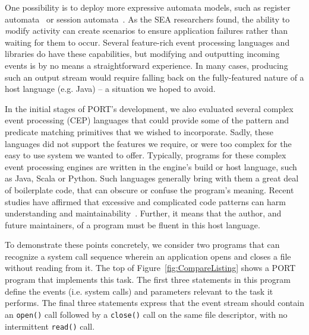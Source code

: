 One possibility is to deploy more expressive automata models, such as register automata~\cite{DBLP:journals/tcs/KaminskiF94} or session automata~\cite{DBLP:journals/corr/BolligHLM14}.  As the 
SEA researchers found,  the ability to
{\textit modify} activity can create scenarios to ensure
application failures rather than  waiting for them to occur.
Several feature-rich event processing
languages and libraries do have these capabilities, but
modifying and outputting
incoming events
is by no means a straightforward experience.
In many cases, producing such an output stream  would require
falling back on the fully-featured nature of a host language (e.g. Java) -- a situation
we hoped to avoid.

In the initial stages of PORT's development, we also
evaluated several
complex event processing (CEP) languages that
could
provide some of the pattern and predicate matching primitives
that we wished to
incorporate.
Sadly,
these languages did not
support  the features
we require,
or were too complex
for the easy to use  system we wanted to offer.
Typically,
programs for these complex event processing engines are
written in the engine's build or host language,
such as Java,
Scala or
Python.
Such languages generally bring with them a great deal of boilerplate code,
that can obscure or confuse
the program's meaning.
Recent studies
have affirmed that excessive and complicated code
patterns can harm
understanding and
maintainability~\cite{misunderstandings}.
Further,
it means that the author,
and future maintainers,
of a
program must be fluent in this host language.


To demonstrate these points concretely,
we consider two programs that can recognize a system call sequence wherein an
application opens and closes a file
without reading from it.
The top of Figure~\ref{fig:CompareListing} shows a PORT program that implements this
task.  The first three statements in this program define the events (i.e.
system calls) and parameters relevant to the task it performs.  The final three statements express that the event stream
should contain an \texttt{open()} call followed by a \texttt{close()} call on the same file descriptor, with no intermittent \texttt{read()} call.

